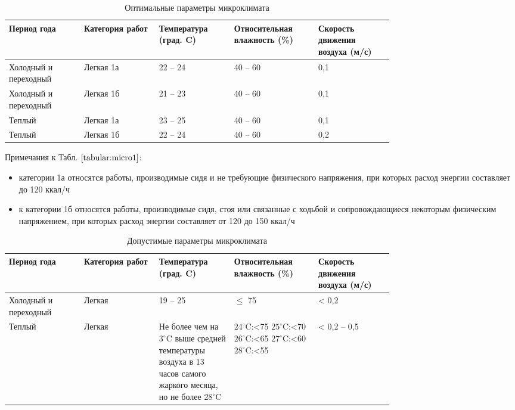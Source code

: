 \documentclass[12pt,a4paper]{report}
\begin{document}
\begin{table} [H]
\label{tabular:micro1}
\begin{center}
\begin{tabular}{|p{0.15\linewidth}|p{0.15\linewidth}|p{0.15\linewidth}|p{0.15\linewidth}|p{0.15\linewidth}|}
\hline
Период года & Категория работ & Температура (град. C) & Относительная влажность (\%) & Скорость движения воздуха (м/с) \\
\hline
Холодный и переходный & Легкая 1а & 22 -- 24 & 40 -- 60 & 0,1 \\
\hline
Холодный и переходный & Легкая 1б & 21 -- 23 & 40 -- 60 & 0,1 \\
\hline
Теплый & Легкая 1а & 23 -- 25 & 40 -- 60 & 0,1 \\
\hline
Теплый & Легкая 1б & 22 -- 24 & 40 -- 60 & 0,2 \\
\hline
\end{tabular}
\end{center}
\caption{Оптимальные параметры микроклимата}
\end{table}

Примечания к Табл. $\ref{tabular:micro1}$:
\begin{itemize}
\item категории 1а относятся работы, производимые сидя и не требующие физического напряжения, при которых расход энергии составляет до 120 ккал/ч
\item к категории 1б относятся работы, производимые сидя, стоя или связанные с ходьбой и сопровождающиеся некоторым физическим напряжением, при которых расход энергии составляет от 120 до 150 ккал/ч
\end{itemize}

\begin{table} [H]
\label{tabular:micro2}
\begin{center}
\begin{tabular}{|p{0.15\linewidth}|p{0.15\linewidth}|p{0.15\linewidth}|p{0.15\linewidth}|p{0.15\linewidth}|}
\hline
Период года & Категория работ & Температура (град. C) & Относительная влажность (\%) & Скорость движения воздуха (м/с) \\
\hline
Холодный и переходный & Легкая & 19 -- 25 & $\le$ 75 & < 0,2 \\
\hline
Теплый & Легкая & Не более чем на $3^\circ$C выше средней температуры воздуха в 13 часов самого жаркого месяца, но не более $28^\circ$C & $24^\circ$C:<75
$25^\circ$C:<70
$26^\circ$C:<65
$27^\circ$C:<60
$28^\circ$C:<55
 & < 0,2 -- 0,5 \\
\hline
\end{tabular}
\end{center}
\caption{Допустимые параметры микроклимата}
\end{table}
\end{document}
